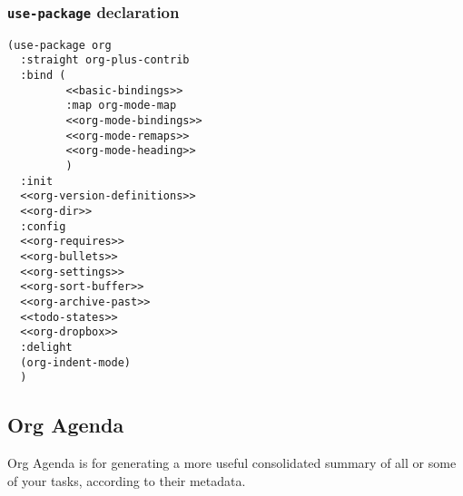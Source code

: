 \documentclass[11pt]{article}
\begin{document}
\subsubsection{\texttt{use-package} declaration}
\label{sec:orgbb56904}

\begin{verbatim}
(use-package org
  :straight org-plus-contrib
  :bind (
         <<basic-bindings>>
         :map org-mode-map
         <<org-mode-bindings>>
         <<org-mode-remaps>>
         <<org-mode-heading>>
         )
  :init
  <<org-version-definitions>>
  <<org-dir>>
  :config
  <<org-requires>>
  <<org-bullets>>
  <<org-settings>>
  <<org-sort-buffer>>
  <<org-archive-past>>
  <<todo-states>>
  <<org-dropbox>>
  :delight
  (org-indent-mode)
  )
\end{verbatim}

\subsection{Org Agenda}
\label{sec:org81de1bc}
Org Agenda is for generating a more useful consolidated summary of all
or some of your tasks, according to their metadata.
\end{document}
